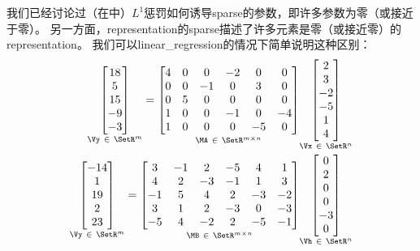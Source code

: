 我们已经讨论过（在中）$L^1$惩罚如何诱导\gls{sparse}的参数，即许多参数为零（或接近于零）。
另一方面，\gls{representation}的\gls{sparse}描述了许多元素是零（或接近零）的\gls{representation}。
我们可以\gls{linear_regression}的情况下简单说明这种区别：
\begin{align}
\underset{\Vy ~\in~ \SetR^m}{
 \begin{bmatrix}
  18 \\  5 \\ 15 \\ -9 \\ -3
 \end{bmatrix}} = 
 \underset{\MA ~\in~ \SetR^{m \times n}}{
 \begin{bmatrix}
  4 & 0 & 0 & -2 & 0 & 0 \\
  0 & 0 & -1 & 0 & 3 & 0 \\
  0 & 5 & 0 & 0 & 0 & 0 \\
  1 & 0 & 0 & -1 & 0 & -4 \\
  1 & 0 & 0 & 0 & -5 & 0
 \end{bmatrix}} 
  \underset{\Vx ~\in~ \SetR^n}{
  \begin{bmatrix}
 2 \\ 3\\ -2\\ -5 \\ 1 \\ 4
 \end{bmatrix} }\\
 \underset{\Vy ~\in~ \SetR^m}{
 \begin{bmatrix}
  -14 \\  1 \\ 19 \\  2 \\ 23
 \end{bmatrix}} = 
 \underset{\MB ~\in~ \SetR^{m \times n}}{
 \begin{bmatrix}
  3 & -1 & 2 & -5 & 4 & 1 \\
  4 & 2 & -3 & -1 & 1 & 3 \\
  -1 & 5 & 4 & 2 & -3 & -2 \\
  3 & 1 & 2 & -3 & 0 & -3 \\
  -5 & 4 & -2 & 2 & -5 & -1
 \end{bmatrix}} 
  \underset{\Vh ~\in~ \SetR^n}{
  \begin{bmatrix}
 0 \\ 2 \\ 0 \\ 0 \\ -3 \\ 0
 \end{bmatrix} }
\end{align}

